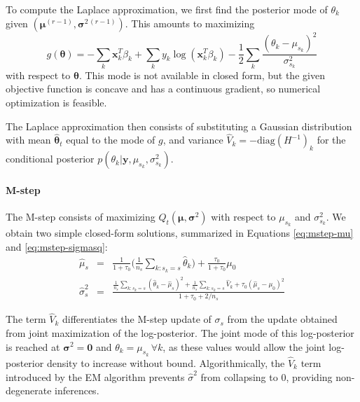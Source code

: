 \documentclass[12pt]{article}
\newcommand{\diag}[1]{\mathrm{diag}\left(#1\right)}
\begin{document}
To compute the Laplace approximation, we first find the posterior mode of
$\theta_k$ given $(\bm \mu^{(r-1)}, \bm \sigma^{2\,(r-1)})$. This amounts to
maximizing
\begin{equation}\label{eq:gFunction}
 g(\bm \theta) = -\sum_k \bm x_k^T \beta_k +
\sum_k y_k \log \left( \bm x_k^T \beta_k \right) -
\frac{1}{2} \sum_k \frac{(\theta_k - \mu_{s_k})^2}{\sigma^2_{s_k}}
\end{equation}
with respect to $\bm \theta$.
This mode is not available in closed form, but the given objective function is concave and has a continuous gradient, so numerical optimization is feasible.

%
The Laplace approximation then consists of substituting a Gaussian distribution with mean $\bm \hat{\theta}_t$ equal to the mode of $g$, and variance $\hat{V}_k = -\diag{H^{-1}}_k$ for the conditional posterior $p(\theta_k | \bm y, \mu_{s_k}, \sigma^2_{s_k} )$.

\paragraph{M-step}
%
The M-step consists of maximizing $Q_t(\bm \mu, \bm \sigma^2)$ with respect to $\mu_{s_k}$ and $\sigma^2_{s_k}$.
We obtain two simple closed-form solutions, summarized in Equations \ref{eq:mstep-mu} and \ref{eq:mstep-sigmasq}:
\begin{eqnarray} \label{eq:mstep-mu}
\hat{\mu}_{s} &=& \frac{1}{1 + \tau_0} \Big(\frac{1}{n_s}
 \sum_{k:s_k = s} \hat{\theta}_k \Big) +
 \frac{\tau_0}{1 + \tau_0} \mu_0 \\ \label{eq:mstep-sigmasq}
\hat{\sigma}^2_{s} &=& \frac{\frac{1}{n_s} \sum_{k:s_k = s}
 (\hat{\theta}_k - \hat{\mu}_{s})^2
 + \frac{1}{n_s} \sum_{k:s_k = s} \hat{V}_k +
 \tau_0 (\hat{\mu}_s - \mu_0)^2}{1+\tau_0 + 2 / n_s}
\end{eqnarray}

The term $\hat{V}_k$ differentiates the M-step update of $\sigma_s$ from the update obtained from joint maximization of the log-posterior.
The joint mode of this log-posterior is reached at $\bm \sigma^2 = \bm 0$ and $\theta_k = \mu_{s_k} \, \forall k$, as these values would allow the joint log-posterior density to increase without bound.
Algorithmically, the $\hat{V}_k$ term introduced by the EM algorithm prevents $\hat{\sigma}^2$ from collapsing to $0$, providing non-degenerate inferences.
\end{document}

